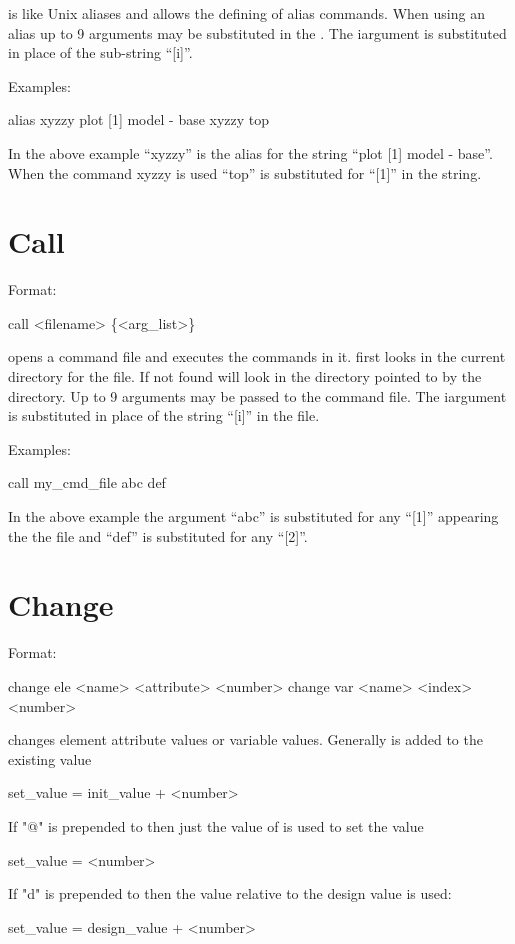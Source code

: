  is like Unix aliases and allows the defining of alias
commands. When using an alias up to 9 arguments may be substituted in the
. The i\Th argument is substituted in place of the sub-string
``[i]''.

Examples:
\begin{example}
    alias xyzzy plot [1] model - base 
    xyzzy top 
\end{example}
In the above example ``xyzzy'' is the alias for the string ``plot [1]
model - base''.  When the command xyzzy is used ``top'' is substituted
for ``[1]'' in the string.

\section{Call}
\label{s:call}

Format: 
\begin{example}
  call <filename> \{<arg_list>\}  \Strut
\end{example}

\vskip 0.2in
 opens a command file and executes the commands in it.  \tao
first looks in the current directory for the file. If not found \tao
will look in the directory pointed to by the 
directory.  Up to 9 arguments may be passed to the command file. The
i\Th argument is substituted in place of the string ``[i]'' in the
file. 

Examples:
\begin{example}
    call my_cmd_file abc def 
\end{example}
In the above example the argument ``abc'' is substituted for any
``[1]'' appearing the the file and ``def'' is substituted for any
``[2]''.

\section{Change}
\label{s:change}

Format:
\begin{example}
  change ele <name> <attribute> <number>
  change var <name> <index> <number>
\end{example}

\vskip 0.2in
 changes element attribute values or variable values. Generally
 is added to the existing value
\begin{example}
  set_value = init_value + <number>
\end{example}
If "@" is prepended to   then just the value of  is used
to set the value
\begin{example}
  set_value = <number>
\end{example}
If "d" is prepended to   then the value relative to the design
value is used:
\begin{example}
  set_value = design_value + <number>
\end{example}

